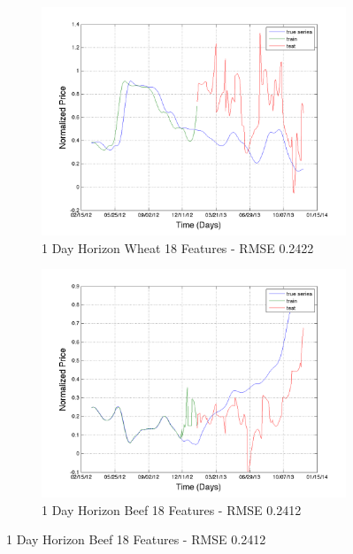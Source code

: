 \begin{figure}
        \centering
        \begin{subfigure}[b]{0.5\textwidth}
                \includegraphics[width=\textwidth]{img/model/exp2/wheat/pred_18}
                \caption{1 Day Horizon Wheat 18 Features - RMSE 0.2422}
                \label{fig:gull}
        \end{subfigure}%
        \begin{subfigure}[b]{0.5\textwidth}
                \includegraphics[width=\textwidth]{img/model/exp3/beef/pred_18}
                \caption{1 Day Horizon Beef 18 Features - RMSE 0.2412  }
                \label{fig:tiger}
        \end{subfigure}
       

\end{figure}

